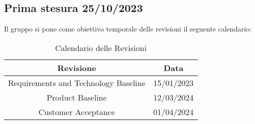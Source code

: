 \subsection{Prima stesura 25/10/2023}
Il gruppo si pone come obiettivo temporale delle revisioni il seguente calendario:
\begin{table}[ht]
    \centering
    \begin{tabular}{|c|c|}
        \hline
        \textbf{Revisione} & \textbf{Data} \\
        \hline
        Requirements and Technology Baseline & 15/01/2023 \\
        Product Baseline  & 12/03/2024 \\
        Customer Acceptance & 01/04/2024 \\
        \hline
    \end{tabular}
    \caption{Calendario delle Revisioni}
\end{table}